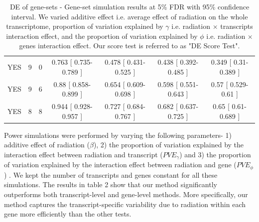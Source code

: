 \documentclass[hidelinks,11pt]{article}
\begin{document}
\begin{table}[!ht]
\begin{center}
{\begin{tabular}{| c | c | c | c | c | c | c |}
YES & 9 & 0 & 0.763 [ 0.735-0.789 ] &  0.478 [ 0.431-0.525 ] &  0.438 [ 0.392-0.485 ] &  0.349 [ 0.31-0.389 ] \\
YES & 9 & 6 & 0.88 [ 0.858-0.899 ] &  0.654 [ 0.609-0.698 ] &  0.598 [ 0.551-0.643 ] &  0.57 [ 0.529-0.61 ] \\
YES & 8 & 8 & 0.944 [ 0.928-0.957 ] &  0.727 [ 0.684-0.767 ] &  0.682 [ 0.637-0.725 ] &  0.65 [ 0.61-0.689 ] \\
\hline \hline
\end{tabular}
}
\label{table:design}
\end{center}
\caption{DE of gene-sets - Gene-set simulation results at 5\% FDR with 95\% confidence interval. We varied additive effect i.e. average effect of radiation on the whole transcriptome, proportion of variation explained by $\gamma$ i.e. radiation $\times$ transcripts interaction effect, and the proportion of variation explained by $\phi$ i.e. radiation $\times$ genes interaction effect. Our score test is referred to as "DE Score Test".}
\end{table}

Power simulations were performed by varying the following parameters- 1) additive effect of radiation ($\beta$), 2) the proportion of variation explained by the interaction effect between radiation and transcript ($PVE_\gamma$) and 3) the proportion of variation explained by the interaction effect between radiation and gene ($PVE_\phi$) . We kept the number of transcripts and genes constant for all these simulations. The results in table 2 show that our method significantly outperforms both transcript-level and gene-level methods. More specifically, our method captures the transcript-specific variability due to radiation within each gene more efficiently than the other tests. 
\end{document}
